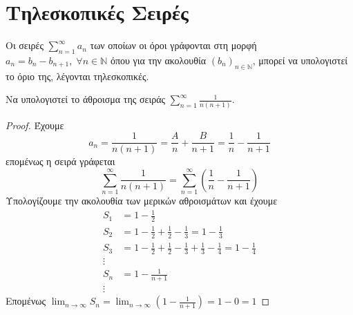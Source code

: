 \section{Τηλεσκοπικές Σειρές}

\begin{mybox1}
\begin{dfn}
    Οι σειρές $ \sum_{n=1}^{\infty} a_{n} $ των οποίων 
    οι όροι γράφονται στη μορφή 
    $ a_{n} = b_{n} - b_{n+1}, \; \forall n \in \mathbb{N} $ όπου για την ακολουθία
    $ {(b_{n})}_{n \in \mathbb{N}}$, μπορεί να υπολογιστεί το όριο της, λέγονται 
    τηλεσκοπικές.
\end{dfn}
\end{mybox1}

\begin{examples}
\item {}
    \begin{enumerate}
        \item Να υπολογιστεί το άθροισμα της σειράς $ \sum_{n=1}^{\infty} 
            \frac{1}{n(n+1)} $.
            \begin{proof}
            \item 
                Έχουμε
                \[
                    a_{n} = \frac{1}{n(n+1)} = \frac{A}{n} + \frac{B}{n+1} = 
                    \frac{1}{n} - \frac{1}{n+1} 
                \]
                επομένως η σειρά γράφεται
                \[
                    \sum_{n=1}^{\infty} \frac{1}{n(n+1)} = 
                    \sum_{n=1}^{\infty} \left(\frac{1}{n} - \frac{1}{n+1}\right) 
                \] 
                Υπολογίζουμε την ακολουθία των μερικών αθροισμάτων και έχουμε
                \begin{align*}
                    S_{1} &= 1- \frac{1}{2} \\
                    S_{2} &= 1- \frac{1}{2} + \frac{1}{2} - \frac{1}{3} = 
                    1 - \frac{1}{3}  \\
                    S_{3} &=  1- \frac{1}{2} + \frac{1}{2} - \frac{1}{3} + 
                    \frac{1}{3} - \frac{1}{4} = 1 - \frac{1}{4}  \\
                    \vdots \\
                    S_{n} &= 1 - \frac{1}{n+1} \\
                    \vdots
                \end{align*}
            Επομένως $ \lim_{n \to \infty} S_{n} = 
            \lim_{n \to \infty} \left(1 - \frac{1}{n+1}\right) = 1 - 0 = 1 $
        \end{proof}


\end{enumerate}
\end{examples}

